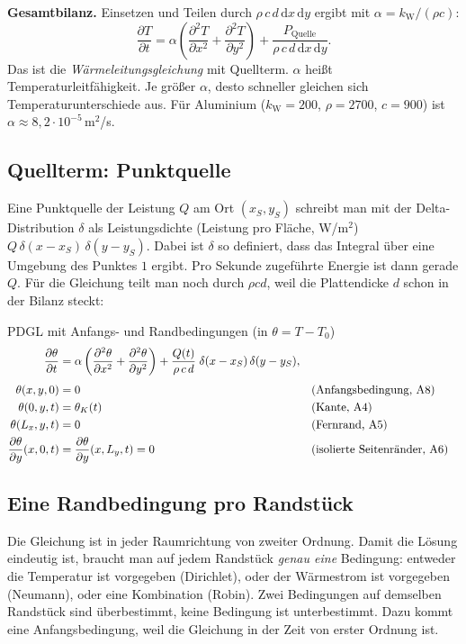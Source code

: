 \documentclass[11pt,a4paper]{article}
\numberwithin{equation}{section}
\newcommand{\dd}{\mathrm{d}}
\newcommand{\pd}[2]{\dfrac{\partial #1}{\partial #2}}
\newcommand{\pdd}[2]{\dfrac{\partial^{2} #1}{\partial #2^{2}}}
\newcommand{\kW}{k_{\mathrm W}}
\newcommand{\thK}{\theta_{K}}
\begin{document}
\textbf{Gesamtbilanz.} Einsetzen und Teilen durch $\rho\,c\,d\,\dd x\,\dd y$ ergibt mit $\alpha=\kW/(\rho c)$:
\begin{equation}
 \pd{T}{t}=\alpha\left(\pdd{T}{x}+\pdd{T}{y}\right)+\frac{P_\mathrm{Quelle}}{\rho\,c\,d\,\dd x\,\dd y}.
 \label{eq:pdgl_roh}
\end{equation}
Das ist die \emph{Wärmeleitungsgleichung} mit Quellterm. $\alpha$ heißt Temperaturleitfähigkeit. Je größer $\alpha$, desto schneller gleichen sich Temperaturunterschiede aus. Für Aluminium ($\kW=200$, $\rho=2700$, $c=900$) ist $\alpha\approx 8{,}2\cdot10^{-5}$\,m$^2$/s.

\subsection{Quellterm: Punktquelle}

Eine Punktquelle der Leistung $Q$ am Ort $(x_S,y_S)$ schreibt man mit der Delta-Distribution $\delta$ als Leistungsdichte (Leistung pro Fläche, W/m$^2$) $Q\,\delta(x-x_S)\,\delta(y-y_S)$. Dabei ist $\delta$ so definiert, dass das Integral über eine Umgebung des Punktes $1$ ergibt. Pro Sekunde zugeführte Energie ist dann gerade $Q$. Für die Gleichung teilt man noch durch $\rho c d$, weil die Plattendicke $d$ schon in der Bilanz steckt:

\begin{ergebnis}{PDGL mit Anfangs- und Randbedingungen (in $\theta=T-T_0$)}
\begin{align}
 \pd{\theta}{t} &= \alpha\left(\pdd{\theta}{x}+\pdd{\theta}{y}\right)+\frac{Q(t)}{\rho\,c\,d}\;\delta(x-x_S)\,\delta(y-y_S), \label{eq:pdgl}\\[0.3em]
 \theta(x,y,0) &= 0 && \text{(Anfangsbedingung, A8)}\notag\\
 \theta(0,y,t) &= \thK(t) && \text{(Kante, A4)}\notag\\
 \theta(L_x,y,t) &= 0 && \text{(Fernrand, A5)}\notag\\
 \pd{\theta}{y}(x,0,t) &= \pd{\theta}{y}(x,L_y,t)=0 && \text{(isolierte Seitenränder, A6)}\notag
\end{align}
\end{ergebnis}

\subsection{Eine Randbedingung pro Randstück}

Die Gleichung ist in jeder Raumrichtung von zweiter Ordnung. Damit die Lösung eindeutig ist, braucht man auf jedem Randstück \emph{genau eine} Bedingung: entweder die Temperatur ist vorgegeben (Dirichlet), oder der Wärmestrom ist vorgegeben (Neumann), oder eine Kombination (Robin). Zwei Bedingungen auf demselben Randstück sind überbestimmt, keine Bedingung ist unterbestimmt. Dazu kommt eine Anfangsbedingung, weil die Gleichung in der Zeit von erster Ordnung ist.
\end{document}
